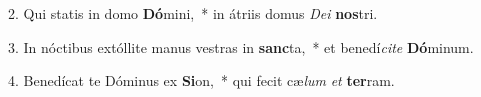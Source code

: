 2. Qui statis in domo \textbf{Dó}mini,~*  in átriis domus \textit{De}\textit{i} \textbf{nos}tri.\

3. In nóctibus extóllite manus vestras in \textbf{sanc}ta,~*  et benedí\textit{ci}\textit{te} \textbf{Dó}minum.\

4. Benedícat te Dóminus ex \textbf{Si}on,~*  qui fecit cæ\textit{lum} \textit{et} \textbf{ter}ram.\

